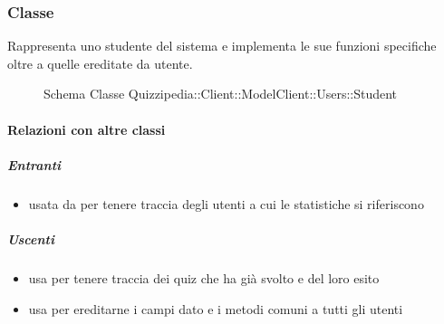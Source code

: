 \subsubsection{Classe }
Rappresenta uno studente del sistema e implementa le sue funzioni specifiche oltre a quelle ereditate da utente.
\begin{figure}[H]
\centering
\noindent{}
\caption[Schema Classe Student]{Schema Classe Quizzipedia::Client::ModelClient::Users::Student}
\end{figure}
\paragraph{Relazioni con altre classi}
\subparagraph{Entranti}
\begin{itemize}
\item usata da  per tenere traccia degli utenti a cui le statistiche si riferiscono
\end{itemize}
\subparagraph{Uscenti}
\begin{itemize}
\item usa  per tenere traccia dei quiz che ha già svolto e del loro esito
\item usa  per ereditarne i campi dato e i metodi comuni a tutti gli utenti
\end{itemize}
